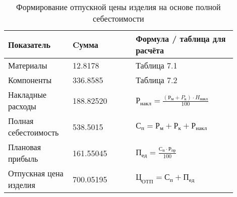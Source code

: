 \begin{table}[H]
  \small
  \caption{Формирование отпускной цены изделия на основе полной себестоимости}
\begin{tabular}{|p{0.25\linewidth}| p{0.25\linewidth} | p{0.40\linewidth}|}
  \hline
  Показатель & Cумма & Формула / таблица для расчёта\\[0pt]
  \hline
  Материалы & 12.8178 & Таблица 7.1\\[0pt]
  \hline
  Компоненты & 336.8585 & Таблица 7.2\\[0pt]
  \hline
  Накладные расходы & 188.82520 & $Р_{накл}=\frac{(Р_м+P_к) \cdot H_{накл}}{100}$ \\[0pt]
  \hline
  Полная себестоимость & 538.5015 & $С_п =Р_м + Р_к + Р_{накл}$ \\[0pt]
  \hline
  Плановая прибыль & 161.55045 & $П_{ед}= \frac{С_п \cdot Р_{пр}}{100}$\\[0pt]
  \hline
  Отпускная цена изделия & 700.05195 & $Ц_{ОТП}=С_п+П_{ед}$\\[0pt]
  \hline
\end{tabular}
\end{table}
